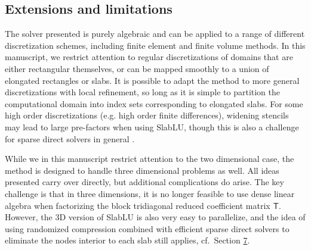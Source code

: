 \documentclass[10pt,a4paper]{amsart}
\newtheorem{remark}{Remark}%
\newcommand{\mtx}[1]{\bm{\mathsf{#1}}}
\begin{document}


\subsection{Extensions and limitations}

The solver presented is purely algebraic and can be applied to a range of different discretization schemes, including finite element and finite volume methods. 
In this manuscript, we restrict attention to regular discretizations of domains that are either rectangular themselves, 
or can be mapped smoothly to a union of elongated rectangles or slabs.
It is possible to adapt the method to more general discretizations with local refinement,
so long as it is simple to partition the computational domain into index sets corresponding to elongated slabs.
For some high order discretizations (e.g. high order finite differences), widening stencils may lead to large pre-factors when using
SlabLU, though this is also a challenge for sparse direct solvers in general \cite[Ch.~20]{2019_martinsson_book}.

While we in this manuscript restrict attention to the two dimensional case, the method is designed to handle three dimensional problems as well. 
All ideas presented carry over directly, but additional complications do arise. 
The key challenge is that in three dimensions, it is no longer feasible to use dense linear algebra when factorizing the block tridiagonal reduced coefficient matrix $\mtx{T}$.
However, the 3D version of SlabLU is also very easy to parallelize, and the idea of using randomized compression combined with efficient sparse direct solvers to eliminate the nodes interior to each slab still applies, cf.~Section \href{https://arxiv.org/abs/2211.07572v3}{7}.
\end{document}
